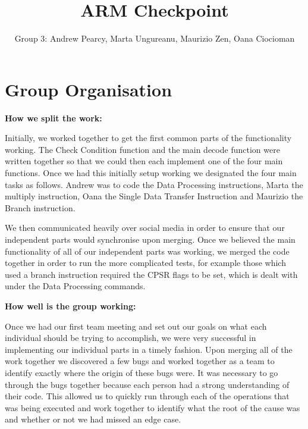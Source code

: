 \documentclass{article}
\newcommand{\tmtextbf}[1]{{\bfseries{#1}}}
\begin{document}
\title{ARM Checkpoint}
\author{Group 3: Andrew Pearcy, Marta Ungureanu, Maurizio Zen, Oana Ciocioman}
\maketitle



\section{Group Organisation}
\begin{paragraph}
\tab
\end{paragraph}

\tmtextbf{How we split the work:}

Initially, we worked together to get the first common parts of the
functionality working. The Check Condition function and the main decode
function were written together so that we could then each implement one of the
four main functions. Once we had this initially setup working we designated
the four main tasks as follows. Andrew was to code the Data Processing
instructions, Marta the multiply instruction, Oana the Single Data Transfer
Instruction and Maurizio the Branch instruction.\newline 

We then communicated heavily over social media in order to ensure that our
independent parts would synchronise upon merging. Once we believed the main
functionality of all of our independent parts was working, we merged the code
together in order to run the more complicated tests, for example those which
used a branch instruction required the CPSR flags to be set, which is dealt
with under the Data Processing commands.\newline


\tmtextbf{How well is the group working:} 

Once we had our first team meeting and set out our goals on what each
individual should be trying to accomplish, we were very successful in
implementing our individual parts in a timely fashion. Upon merging all of the
work together we discovered a few bugs and worked together as a team to
identify exactly where the origin of these bugs were. It was necessary to go
through the bugs together because each person had a strong understanding of
their code. This allowed us to quickly run through each of the operations that
was being executed and work together to identify what the root of the cause
was and whether or not we had missed an edge case.\newline
\end{document}
